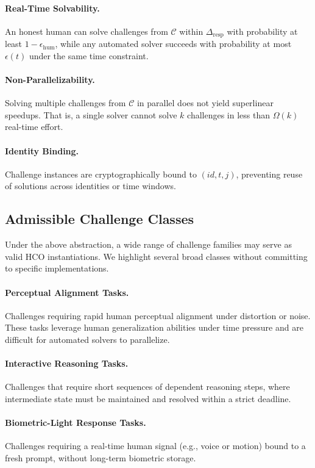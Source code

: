 \documentclass[sigconf,nonacm]{acmart}
\begin{document}
\paragraph{Real-Time Solvability.}
An honest human can solve challenges from $\mathcal{C}$ within $\Delta_{\mathrm{resp}}$ with probability at least $1 - \epsilon_{\mathrm{hum}}$, while any automated solver succeeds with probability at most $\epsilon(t)$ under the same time constraint.

\paragraph{Non-Parallelizability.}
Solving multiple challenges from $\mathcal{C}$ in parallel does not yield superlinear speedups. That is, a single solver cannot solve $k$ challenges in less than $\Omega(k)$ real-time effort.

\paragraph{Identity Binding.}
Challenge instances are cryptographically bound to $(id,t,j)$, preventing reuse of solutions across identities or time windows.

\subsection{Admissible Challenge Classes}

Under the above abstraction, a wide range of challenge families may serve as valid HCO instantiations. We highlight several broad classes without committing to specific implementations.

\paragraph{Perceptual Alignment Tasks.}
Challenges requiring rapid human perceptual alignment under distortion or noise. These tasks leverage human generalization abilities under time pressure and are difficult for automated solvers to parallelize.

\paragraph{Interactive Reasoning Tasks.}
Challenges that require short sequences of dependent reasoning steps, where intermediate state must be maintained and resolved within a strict deadline.

\paragraph{Biometric-Light Response Tasks.}
Challenges requiring a real-time human signal (e.g., voice or motion) bound to a fresh prompt, without long-term biometric storage.
\end{document}
